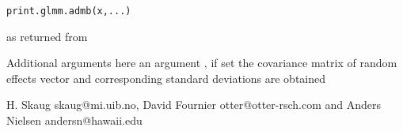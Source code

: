 \begin{Description}\relax
\end{Description}
\begin{Usage}
\begin{verbatim}
print.glmm.admb(x,...)
        \end{verbatim}
\end{Usage}
\begin{Arguments}
\begin{ldescription}
\item[\code{x}] as returned from  
\item[\code{...}] Additional arguments here an argument , if set 
 the covariance matrix of random effects vector and corresponding 
standard deviations are obtained
\end{ldescription}
\end{Arguments}
\begin{Author}\relax
H. Skaug skaug@mi.uib.no, David Fournier otter@otter-rsch.com and 
Anders Nielsen andersn@hawaii.edu
\end{Author}
\begin{SeeAlso}\relax
{}
\end{SeeAlso}


